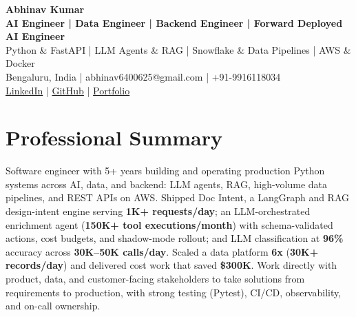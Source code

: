 \documentclass[10pt]{article}
\begin{document}
\begin{center}
{\LARGE\bfseries Abhinav Kumar}\\[3pt]
{\small\bfseries AI Engineer | Data Engineer | Backend Engineer | Forward Deployed AI Engineer}\\[1pt]
{\small Python \& FastAPI | LLM Agents \& RAG | Snowflake \& Data Pipelines | AWS \& Docker}\\[2pt]
Bengaluru, India | abhinav6400625@gmail.com | +91-9916118034\\
\href{https://www.linkedin.com/in/dotabhinav/}{LinkedIn} | \href{https://github.com/singhdotabhinav}{GitHub} | \href{https://singhdotabhinav.github.io/portfolio}{Portfolio}
\end{center}

\section*{Professional Summary}
Software engineer with 5+ years building and operating production Python systems across AI, data, and backend: LLM agents, RAG, high-volume data pipelines, and REST APIs on AWS. Shipped Doc Intent, a LangGraph and RAG design-intent engine serving \textbf{1K+ requests/day}; an LLM-orchestrated enrichment agent (\textbf{150K+ tool executions/month}) with schema-validated actions, cost budgets, and shadow-mode rollout; and LLM classification at \textbf{96\%} accuracy across \textbf{30K--50K calls/day}. Scaled a data platform \textbf{6x} (\textbf{30K+ records/day}) and delivered cost work that saved \textbf{\$300K}. Work directly with product, data, and customer-facing stakeholders to take solutions from requirements to production, with strong testing (Pytest), CI/CD, observability, and on-call ownership.
\end{document}
